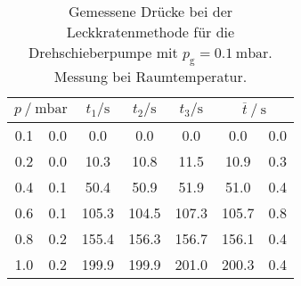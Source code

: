 \begin{table} 
\centering 
\caption{Gemessene Drücke bei der Leckkratenmethode für die Drehschieberpumpe mit $p_{\mathrm{g}}=\SI{0.1}{\milli\bar}$. Messung bei Raumtemperatur.} 
\label{tab: leck_dreh_leck_0.1.pdf} 
\begin{tabular}{S[table-format=1.1]@{${}\pm{}$} S[table-format=1.1] S S S S[table-format=1.1]@{${}\pm{}$} S[table-format=1.1] } 
\toprule  
{} & {$t_1 / \si{ \second}$} & {$t_2 / \si{ \second}$} & {$t_3 / \si{ \second}$} &  \\ 
 & 0.0 & 0.0 & 0.0 & 0.0 & 0.0 & 0.0\\ 
0.2 & 0.0 & 10.3 & 10.8 & 11.5 & 10.9 & 0.3\\ 
0.4 & 0.1 & 50.4 & 50.9 & 51.9 & 51.0 & 0.4\\ 
0.6 & 0.1 & 105.3 & 104.5 & 107.3 & 105.7 & 0.8\\ 
0.8 & 0.2 & 155.4 & 156.3 & 156.7 & 156.1 & 0.4\\ 
1.0 & 0.2 & 199.9 & 199.9 & 201.0 & 200.3 & 0.4\\ 
\bottomrule 
\end{tabular} 
\end{table}
